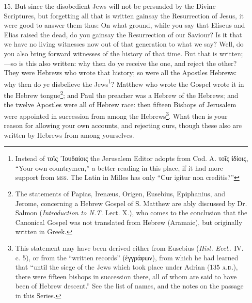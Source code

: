 15. But since the disobedient Jews will not be persuaded by the Divine Scriptures, but forgetting all that is written gainsay the Resurrection of Jesus, it were good to answer them thus: On what ground, while you say that Eliseus and Elias raised the dead, do you gainsay the Resurrection of our Saviour? Is it that we have no living witnesses now out of that generation to what we say? Well, do you also bring forward witnesses of the history of that time. But that is written;—so is this also written: why then do ye receive the one, and reject the other? They were Hebrews who wrote that history; so were all the Apostles Hebrews: why then do ye disbelieve the Jews\footnote{Instead of \textgreek{τοῖς ᾽Ιουδαίοις} the Jerusalem Editor adopts from Cod. A. \textgreek{τοῖς ἰδίοις}, “Your own countrymen,” a better reading in this place, if it had more support from \textsc{mss.} The Latin in Milles has only “Cur igitur non creditis?”}? Matthew who wrote the Gospel wrote it in the Hebrew tongue\footnote{The statements of Papias, Irenæus, Origen, Eusebius, Epiphanius, and Jerome, concerning a Hebrew Gospel of S. Matthew are ably discussed by Dr. Salmon (\emph{Introduction to N.T.} Lect. X.), who comes to the conclusion that the Canonical Gospel was not translated from Hebrew (Aramaic), but originally written in Greek.}; and Paul the preacher was a Hebrew of the Hebrews; and the twelve Apostles were all of Hebrew race: then fifteen Bishops of Jerusalem were appointed in succession from among the Hebrews\footnote{This statement may have been derived either from Eusebius (\emph{Hist. Eccl.}. IV. c. 5), or from the “written records” (\textgreek{ἐγγράφων}), from which he had learned that “until the siege of the Jews which took place under Adrian (135 \textsc{a.d.}), there were fifteen bishops in succession there, all of whom are said to have been of Hebrew descent.” See the list of names, and the notes on the passage in this Series.}. What then is your reason for allowing your own accounts, and rejecting ours, though these also are written by Hebrews from among yourselves.

